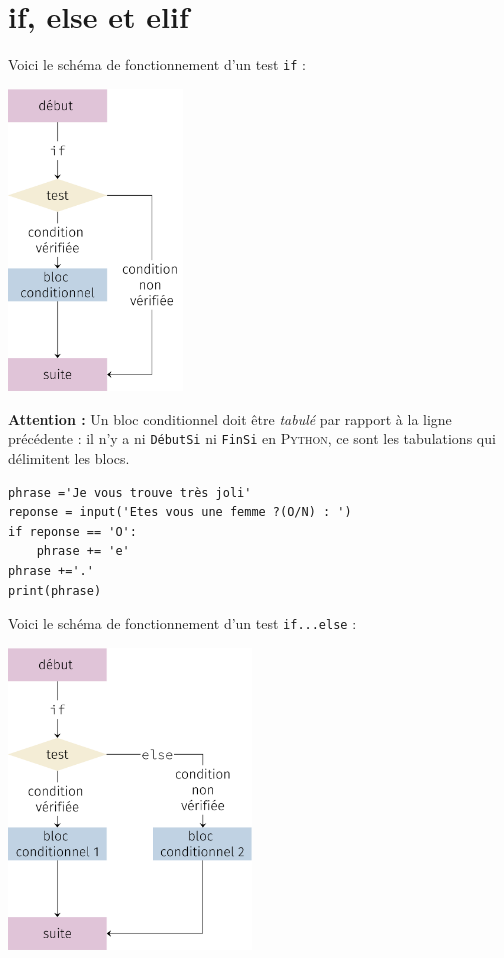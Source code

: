 \section{if, else et elif}
Voici le schéma de fonctionnement d'un test \texttt{if} :
\begin{center}
	\includegraphics[height=8cm]{ch-conditions/img/if}
\end{center}

\textbf{Attention :} Un bloc conditionnel doit être \textit{tabulé} par rapport à la ligne précédente : il n'y a ni \texttt{DébutSi}  ni \texttt{FinSi}
en \textsc{Python}, ce sont les tabulations qui délimitent les blocs.

\begin{pyc}
	\begin{verbatim}
phrase ='Je vous trouve très joli'
reponse = input('Etes vous une femme ?(O/N) : ')
if reponse == 'O':
    phrase += 'e'
phrase +='.'
print(phrase)
\end{verbatim}
\end{pyc}

Voici le schéma de fonctionnement d'un test \texttt{if...else} :
\begin{center}
	\includegraphics[height=8cm]{ch-conditions/img/ifelse}
\end{center}


